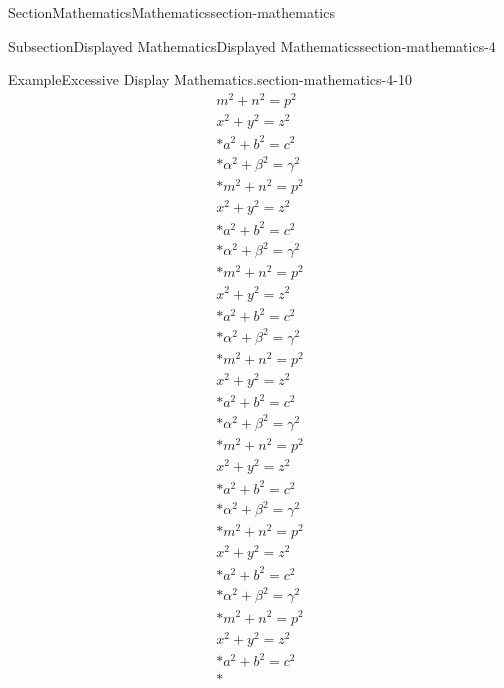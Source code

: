 \documentclass[twoside,10pt,]{article}
\numberwithin{equation}{section}
\begin{document}
\begin{sectionptx}{Section}{Mathematics}{}{Mathematics}{}{}{section-mathematics}
\begin{subsectionptx}{Subsection}{Displayed Mathematics}{}{Displayed Mathematics}{}{}{section-mathematics-4}
\begin{example}{Example}{Excessive Display Mathematics.}{section-mathematics-4-10}
\begin{gather}
m^2+n^2=p^2\label{section-mathematics-4-10-3-2-4}\\
x^2+y^2=z^2\label{section-mathematics-4-10-3-2-5}\\*
a^2+b^2=c^2\label{section-mathematics-4-10-3-2-6}\\*
\alpha^2+\beta^2=\gamma^2\label{section-mathematics-4-10-3-2-7}\\*
m^2+n^2=p^2\label{section-mathematics-4-10-3-2-8}\\
x^2+y^2=z^2\label{section-mathematics-4-10-3-2-9}\\*
a^2+b^2=c^2\label{section-mathematics-4-10-3-2-10}\\*
\alpha^2+\beta^2=\gamma^2\label{section-mathematics-4-10-3-2-11}\\*
m^2+n^2=p^2\label{section-mathematics-4-10-3-2-12}\\
x^2+y^2=z^2\label{section-mathematics-4-10-3-2-13}\\*
a^2+b^2=c^2\label{section-mathematics-4-10-3-2-14}\\*
\alpha^2+\beta^2=\gamma^2\label{section-mathematics-4-10-3-2-15}\\*
m^2+n^2=p^2\label{section-mathematics-4-10-3-2-16}\\
x^2+y^2=z^2\label{section-mathematics-4-10-3-2-17}\\*
a^2+b^2=c^2\label{section-mathematics-4-10-3-2-18}\\*
\alpha^2+\beta^2=\gamma^2\label{section-mathematics-4-10-3-2-19}\\*
m^2+n^2=p^2\label{section-mathematics-4-10-3-2-20}\\
x^2+y^2=z^2\label{section-mathematics-4-10-3-2-21}\\*
a^2+b^2=c^2\label{section-mathematics-4-10-3-2-22}\\*
\alpha^2+\beta^2=\gamma^2\label{section-mathematics-4-10-3-2-23}\\*
m^2+n^2=p^2\label{section-mathematics-4-10-3-2-24}\\
x^2+y^2=z^2\label{section-mathematics-4-10-3-2-25}\\*
a^2+b^2=c^2\label{section-mathematics-4-10-3-2-26}\\*
\alpha^2+\beta^2=\gamma^2\label{section-mathematics-4-10-3-2-27}\\*
m^2+n^2=p^2\label{section-mathematics-4-10-3-2-28}\\
x^2+y^2=z^2\label{section-mathematics-4-10-3-2-29}\\*
a^2+b^2=c^2\label{section-mathematics-4-10-3-2-30}\\*

\end{gather}
\end{example}
\end{subsectionptx}
\end{sectionptx}
\end{document}
